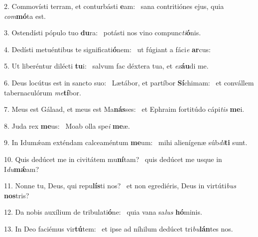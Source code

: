 2. Commovísti terram, et conturbásti \textbf{e}am: \ast\  sana contritiónes ejus, quia \textit{com}\textbf{mó}ta est.\

3. Ostendísti pópulo tuo \textbf{du}ra: \ast\  potásti nos vino compunc\textit{ti}\textbf{ó}nis.\

4. Dedísti metuéntibus te significati\textbf{ó}nem: \ast\  ut fúgiant a fáci\textit{e} \textbf{ar}cus:\

5. Ut liberéntur dilécti \textbf{tu}i: \ast\  salvum fac déxtera tua, et \textit{ex}\textbf{áu}di me.\

6. Deus locútus est in sancto suo: \dag\  Lætábor, et partíbor \textbf{Sí}chimam: \ast\  et convállem tabernaculórum \textit{me}\textbf{tí}bor.\

7. Meus est Gálaad, et meus est Ma\textbf{nás}ses: \ast\  et Ephraim fortitúdo cápi\textit{tis} \textbf{me}i.\

8. Juda rex \textbf{me}us: \ast\  Moab olla spe\textit{i} \textbf{me}æ.\

9. In Idumǽam exténdam calceaméntum \textbf{me}um: \ast\  mihi alienígenæ súb\textit{di}\textbf{ti} sunt.\

10. Quis dedúcet me in civitátem mu\textbf{ní}tam? \ast\  quis dedúcet me usque in I\textit{du}\textbf{mǽ}am?\

11. Nonne tu, Deus, qui repu\textbf{lís}ti nos? \ast\  et non egrediéris, Deus in virtúti\textit{bus} \textbf{nos}tris?\

12. Da nobis auxílium de tribulati\textbf{ó}ne: \ast\  quia vana sa\textit{lus} \textbf{hó}minis.\

13. In Deo faciémus vir\textbf{tú}tem: \ast\  et ipse ad níhilum dedúcet tri\textit{bu}\textbf{lán}tes nos.\

